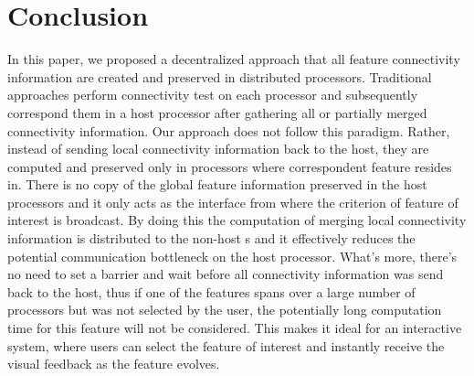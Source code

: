 \documentclass[10pt, conference, compsocconf]{IEEEtran}
\begin{document}
\section{Conclusion}
In this paper, we proposed a decentralized approach that all feature connectivity information are created and preserved in distributed processors. Traditional approaches perform connectivity test on each processor and subsequently correspond them in a host processor after gathering all or partially merged connectivity information. Our approach does not follow this paradigm. Rather, instead of sending local connectivity information back to the host, they are computed and preserved only in processors where correspondent feature resides in. There is no copy of the global feature information preserved in the host processors and it only acts as the interface from where the criterion of feature of interest is broadcast. By doing this the computation of merging local connectivity information is distributed to the non-host s and it effectively reduces the potential communication bottleneck on the host processor. What's more, there's no need to set a barrier and wait before all connectivity information was send back to the host, thus if one of the features spans over a large number of processors but was not selected by the user, the potentially long computation time for this feature will not be considered. This makes it ideal for an interactive system, where users can select the feature of interest and instantly receive the visual feedback as the feature evolves.

%
\end{document}
